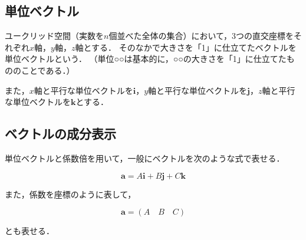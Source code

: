 \documentclass[a4paper,11pt]{ltjsarticle}
\begin{document}
\vspace{-10pt}

\subsection{単位ベクトル}
\label{sec: vec-unit}

ユークリッド空間（実数を$n$個並べた全体の集合）において，3つの直交座標をそれぞれ$x$軸，$y$軸，$z$軸とする．
そのなかで大きさを「1」に仕立てたベクトルを単位ベクトルという．
（単位○○は基本的に，○○の大きさを「1」に仕立てたもののことである．）

また，$x$軸と平行な単位ベクトルを$\bm{i}$，$y$軸と平行な単位ベクトルを$\bm{j}$，$z$軸と平行な単位ベクトルを$\bm{k}$とする．

\subsection{ベクトルの成分表示}

単位ベクトルと係数倍を用いて，一般にベクトルを次のような式で表せる．

\begin{equation}
  \bm{a}=A \bm{i}+B \bm{j}+C \bm{k}
\end{equation}

また，係数を座標のように表して，

\begin{equation}
  \bm{a}=(A \quad B \quad C)
\end{equation}

とも表せる．

\clearpage

%
%
%
\end{document}
